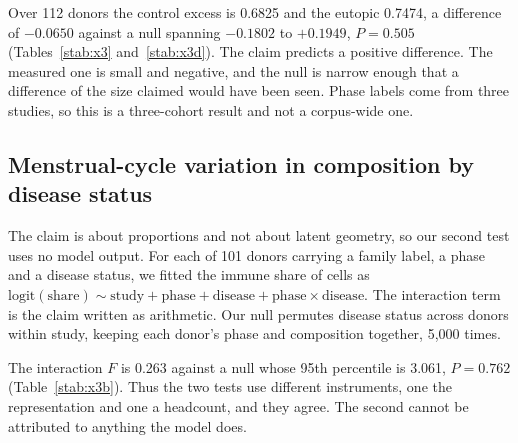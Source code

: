 Over 112 donors the control excess is 0.6825 and the eutopic 0.7474, a
difference of $-0.0650$ against a null spanning $-0.1802$ to $+0.1949$,
$P = 0.505$ (Tables~\ref{stab:x3} and~\ref{stab:x3d}). The claim predicts a
positive difference. The measured one is small and negative, and the null
is narrow enough that a difference of the size claimed would have been
seen. Phase labels come from three studies, so this is a three-cohort
result and not a corpus-wide one.

\begin{table}[t]
\centering
\caption[X3, cycle agreement by disease]{\textbf{Cross-donor cycle
agreement among control donors and among eutopic donors.}}
\label{stab:x3}
\small

\end{table}

\begin{table}[t]
\centering
\caption[X3, the difference and its null]{\textbf{The difference between
the two groups and its permutation null.}}
\label{stab:x3d}
\small

\end{table}

\subsection{Menstrual-cycle variation in composition by disease status}

The claim is about proportions and not about latent geometry, so our second
test uses no model output. For each of 101 donors carrying a family label,
a phase and a disease status, we fitted the immune share of cells as
$\mathrm{logit}(\text{share}) \sim \text{study} + \text{phase} +
\text{disease} + \text{phase} \times \text{disease}$. The interaction term
is the claim written as arithmetic. Our null permutes disease status across
donors within study, keeping each donor's phase and composition together,
5{,}000 times.

The interaction $F$ is 0.263 against a null whose 95th percentile is 3.061,
$P = 0.762$ (Table~\ref{stab:x3b}). Thus the two tests use different
instruments, one the representation and one a headcount, and they agree.
The second cannot be attributed to anything the model does.

\begin{table}[t]
\centering
\caption[X3b, the interaction test]{\textbf{The phase-by-disease interaction
on immune composition}, 101 donors, study as a covariate.}
\label{stab:x3b}
\small

\end{table}

